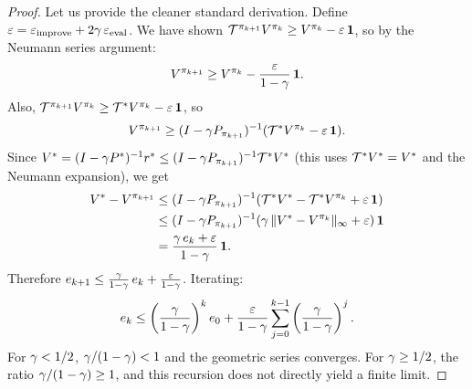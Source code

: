 \documentclass[11pt,a4paper]{article}
\begin{document}
\begin{proof}
Let us provide the cleaner standard derivation. Define
$\varepsilon = \varepsilon_{\mathrm{improve}}
+ 2\gamma\,\varepsilon_{\mathrm{eval}}$. We have shown
$\mathcal{T}^{\pi_{k+1}} V^{\pi_k}
\geq V^{\pi_k} - \varepsilon\,\mathbf{1}$,
so by the Neumann series argument:
\begin{equation}
  V^{\pi_{k+1}}
  \geq V^{\pi_k} - \frac{\varepsilon}{1-\gamma}\,\mathbf{1}.
  \label{eq:value_drop}
\end{equation}
Also, $\mathcal{T}^{\pi_{k+1}} V^{\pi_k}
\geq \mathcal{T}^* V^{\pi_k} - \varepsilon\,\mathbf{1}$, so
\begin{equation}
  V^{\pi_{k+1}}
  \geq (I - \gamma P_{\pi_{k+1}})^{-1}
  (\mathcal{T}^* V^{\pi_k} - \varepsilon\,\mathbf{1}).
\end{equation}
Since $V^* = (I - \gamma P^*)^{-1} r^*
\leq (I - \gamma P_{\pi_{k+1}})^{-1} \mathcal{T}^* V^*$
(this uses $\mathcal{T}^* V^* = V^*$ and the Neumann expansion),
we get
\begin{align}
  V^* - V^{\pi_{k+1}}
  &\leq (I - \gamma P_{\pi_{k+1}})^{-1}
  (\mathcal{T}^* V^* - \mathcal{T}^* V^{\pi_k}
  + \varepsilon\,\mathbf{1}) \nonumber\\
  &\leq (I - \gamma P_{\pi_{k+1}})^{-1}
  (\gamma\,\|V^* - V^{\pi_k}\|_\infty
  + \varepsilon)\,\mathbf{1} \nonumber\\
  &= \frac{\gamma\, e_k + \varepsilon}{1-\gamma}\,\mathbf{1}.
  \label{eq:clean_recurse}
\end{align}
Therefore $e_{k+1} \leq \frac{\gamma}{1-\gamma}\, e_k
+ \frac{\varepsilon}{1-\gamma}$. Iterating:
\begin{equation}
  e_k \leq \left(\frac{\gamma}{1-\gamma}\right)^k e_0
  + \frac{\varepsilon}{1-\gamma}
  \sum_{j=0}^{k-1}\left(\frac{\gamma}{1-\gamma}\right)^j.
\end{equation}
For $\gamma < 1/2$, $\gamma/(1-\gamma) < 1$ and the
geometric series converges. For $\gamma \geq 1/2$, the ratio
$\gamma/(1-\gamma) \geq 1$, and this recursion does not
directly yield a finite limit.


\end{proof}
\end{document}
